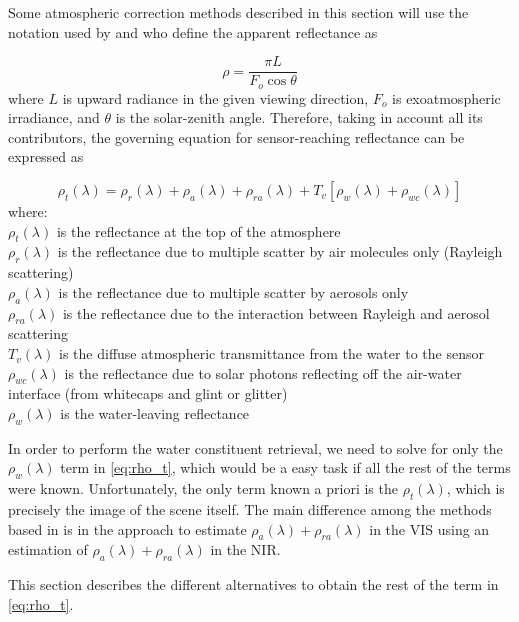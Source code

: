 Some atmospheric correction methods described in this section will use the notation used by \cite{Gordon:1994} and \cite{Ruddick:2000bs} who define the apparent reflectance as 

\begin{equation}\label{eq:rho}
  \rho = \frac{\pi L}{F_o \cos{\theta}}
\end{equation}
where $L$ is upward radiance in the given viewing direction, $F_o$ is exoatmospheric irradiance, and $\theta$ is the solar-zenith angle. Therefore, taking in account all its contributors, the governing equation for sensor-reaching reflectance can be expressed as

\begin{equation}\label{eq:rho_t}
  \rho_t(\lambda) = \rho_r(\lambda) + \rho_a(\lambda) + \rho_{ra}(\lambda) + T_v[\rho_w(\lambda) + \rho_{wc}(\lambda)]
\end{equation}
where:\\
$\rho_t(\lambda)$ is the reflectance at the top of the atmosphere \\
$\rho_r(\lambda)$ is the reflectance due to multiple scatter by air molecules only (Rayleigh scattering)\\
$\rho_a(\lambda)$ is the reflectance due to multiple scatter by aerosols only\\
$\rho_{ra}(\lambda)$ is the reflectance due to
the interaction between Rayleigh and aerosol scattering\\
$T_v(\lambda)$ is the diffuse atmospheric transmittance from the water to the sensor\\
$\rho_{wc}(\lambda)$ is the reflectance due to solar photons reflecting off the air-water interface (from whitecaps and glint or glitter)\\
$\rho_w(\lambda)$ is the water-leaving reflectance

In order to perform the water constituent retrieval, we need to solve for only the $\rho_w(\lambda)$ term in \autoref{eq:rho_t}, which would be a easy task if all the rest of the terms were known. Unfortunately, the only term known a priori is the $\rho_t(\lambda)$, which is precisely the image of the scene itself. The main difference among the methods based in \cite{Gordon:1994} is in the approach to estimate $\rho_a(\lambda) + \rho_{ra}(\lambda)$ in the VIS using an estimation of $\rho_a(\lambda) + \rho_{ra}(\lambda)$ in the NIR.

This section describes the different alternatives to obtain the rest of the term in \autoref{eq:rho_t}.

